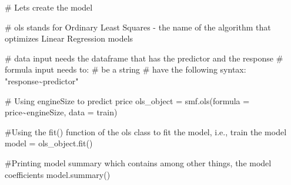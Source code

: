 \documentclass[
  letterpaper,
  DIV=11,
  numbers=noendperiod]{scrreprt}
\newenvironment{Shaded}{\begin{snugshade}}{\end{snugshade}}
\newcommand{\CommentTok}[1]{\textcolor[rgb]{0.37,0.37,0.37}{#1}}
\newcommand{\NormalTok}[1]{\textcolor[rgb]{0.00,0.23,0.31}{#1}}
\newcommand{\OperatorTok}[1]{\textcolor[rgb]{0.37,0.37,0.37}{#1}}
\newcommand{\StringTok}[1]{\textcolor[rgb]{0.13,0.47,0.30}{#1}}
\begin{document}
\begin{Shaded}
\begin{Highlighting}[]
\CommentTok{\# Let\textquotesingle{}s create the model}
    
\CommentTok{\# ols stands for Ordinary Least Squares {-} the name of the algorithm that optimizes Linear Regression models}

\CommentTok{\# data input needs the dataframe that has the predictor and the response}
\CommentTok{\# formula input needs to:}
    \CommentTok{\# be a string}
    \CommentTok{\# have the following syntax: "response\textasciitilde{}predictor"}
    
\CommentTok{\# Using engineSize to predict price}
\NormalTok{ols\_object }\OperatorTok{=}\NormalTok{ smf.ols(formula }\OperatorTok{=} \StringTok{\textquotesingle{}price\textasciitilde{}engineSize\textquotesingle{}}\NormalTok{, data }\OperatorTok{=}\NormalTok{ train)}
\end{Highlighting}
\end{Shaded}

\begin{Shaded}
\begin{Highlighting}[]
\CommentTok{\#Using the fit() function of the \textquotesingle{}ols\textquotesingle{} class to fit the model, i.e., train the model}
\NormalTok{model }\OperatorTok{=}\NormalTok{ ols\_object.fit()}
\end{Highlighting}
\end{Shaded}

\begin{Shaded}
\begin{Highlighting}[]
\CommentTok{\#Printing model summary which contains among other things, the model coefficients}
\NormalTok{model.summary()}
\end{Highlighting}
\end{Shaded}
\end{document}
